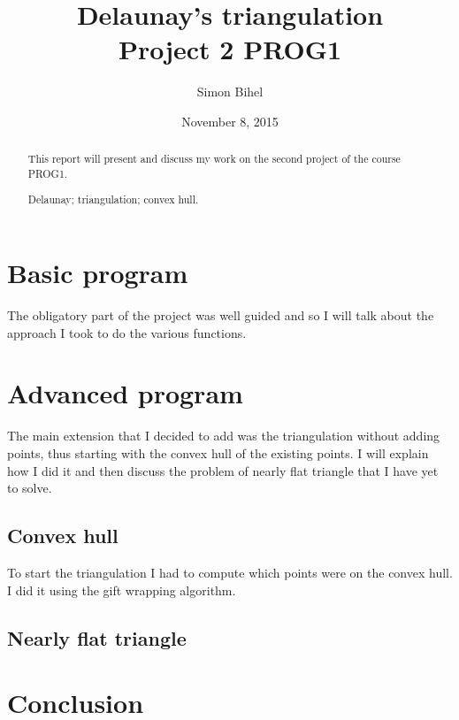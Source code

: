 \documentclass[a4paper,11pt]{article}%
\newenvironment{keywords}%
{\description\item[Keyword.]}%
{\enddescription}
\begin{document}
\title{Delaunay's triangulation \\ Project 2 PROG1}

\author{Simon Bihel}

\date{November 8, 2015}

\maketitle

\begin{abstract}
	This report will present and discuss my work on the second project of the course PROG1.
\begin{keywords}
	Delaunay; triangulation; convex hull.
\end{keywords}
\end{abstract}


\section{Basic program}

The obligatory part of the project was well guided and so I will talk about the approach I took to do the various functions. \\







\section{Advanced program}

The main extension that I decided to add was the triangulation without adding points, thus starting with the convex hull of the existing points. I will explain how I did it and then discuss the problem of nearly flat triangle that I have yet to solve.

\subsection{Convex hull}
To start the triangulation I had to compute which points were on the convex hull. I did it using the gift wrapping algorithm.

\subsection{Nearly flat triangle}


\section{Conclusion}
\end{document}
